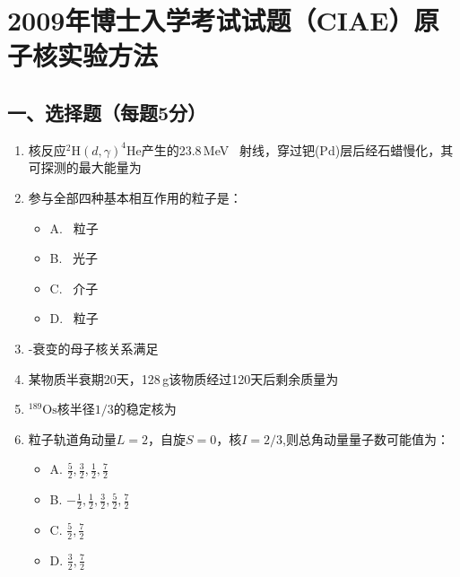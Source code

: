 \documentclass{article}
\begin{document}
\section*{2009年博士入学考试试题（CIAE）原子核实验方法}

\subsection*{一、选择题（每题5分）}

\begin{enumerate}[label=\arabic*.]
    \item 核反应$ ^2\text{H}(d, \gamma)^4\text{He} $产生的23.8\,MeV \textgamma\ 射线，穿过钯(Pd)层后经石蜡慢化，其可探测的最大能量为\underline{\hspace{2cm}}
    
    \item 参与全部四种基本相互作用的粒子是：
    \begin{itemize}[label={},leftmargin=2em]
        \item A. \textbeta\ 粒子 
        \item B. \textgamma\ 光子
        \item C. \textpi\ 介子 
        \item D. \textupsilon\ 粒子
    \end{itemize}
    
    \item \textbeta-衰变的母子核关系满足\underline{\hspace{2cm}}
    
    \item 某物质半衰期20天，128\,g该物质经过120天后剩余质量为\underline{\hspace{2cm}}
    
    \item $^{189}\text{Os}$核半径$1/3$的稳定核为
    
    \item 粒子轨道角动量$L=2$，自旋$S=0$，核$I=2/3$,则总角动量量子数可能值为：
    \begin{itemize}[label={},leftmargin=2em]
        \item A. $\frac{5}{2}, \frac{3}{2}, \frac{1}{2}, \frac{7}{2}$
        \item B. $-\frac{1}{2}, \frac{1}{2}, \frac{3}{2}, \frac{5}{2}, \frac{7}{2}$
        \item C. $\frac{5}{2}, \frac{7}{2}$ 
        \item D. $\frac{3}{2}, \frac{7}{2}$
    \end{itemize}
    

\end{enumerate}
\end{document}
